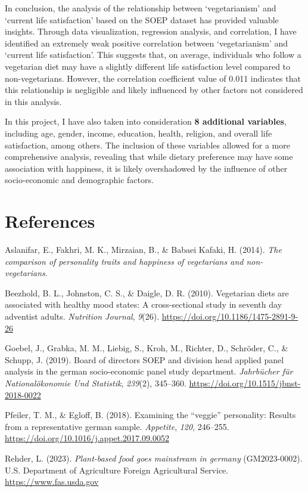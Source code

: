 \documentclass[
]{article}
\newlength{\cslhangindent}
\newenvironment{CSLReferences}[2] %
 {\begin{list}{}{%
  \setlength{\itemindent}{0pt}
  \setlength{\leftmargin}{0pt}
  \setlength{\parsep}{0pt}
  \ifodd #1
   \setlength{\leftmargin}{\cslhangindent}
   \setlength{\itemindent}{-1\cslhangindent}
  \fi
  \setlength{\itemsep}{#2\baselineskip}}}
 {\end{list}}
\begin{document}
In conclusion, the analysis of the relationship between `vegetarianism'
and `current life satisfaction' based on the SOEP dataset has provided
valuable insights. Through data visualization, regression analysis, and
correlation, I have identified an extremely weak positive correlation
between `vegetarianism' and `current life satisfaction'. This suggests
that, on average, individuals who follow a vegetarian diet may have a
slightly different life satisfaction level compared to non-vegetarians.
However, the correlation coefficient value of 0.011 indicates that this
relationship is negligible and likely influenced by other factors not
considered in this analysis.

In this project, I have also taken into consideration \textbf{8
additional variables}, including age, gender, income, education, health,
religion, and overall life satisfaction, among others. The inclusion of
these variables allowed for a more comprehensive analysis, revealing
that while dietary preference may have some association with happiness,
it is likely overshadowed by the influence of other socio-economic and
demographic factors.

\section*{References}\label{references}

\label{refs}
\begin{CSLReferences}{1}{0}
Aslanifar, E., Fakhri, M. K., Mirzaian, B., \& Babaei Kafaki, H. (2014).
\emph{The comparison of personality traits and happiness of vegetarians
and non-vegetarians}.

Beezhold, B. L., Johnston, C. S., \& Daigle, D. R. (2010). Vegetarian
diets are associated with healthy mood states: A cross-sectional study
in seventh day adventist adults. \emph{Nutrition Journal}, \emph{9}(26).
\url{https://doi.org/10.1186/1475-2891-9-26}

Goebel, J., Grabka, M. M., Liebig, S., Kroh, M., Richter, D., Schröder,
C., \& Schupp, J. (2019). Board of directors SOEP and division head
applied panel analysis in the german socio-economic panel study
department. \emph{Jahrb{ü}cher f{ü}r National{ö}konomie Und Statistik},
\emph{239}(2), 345--360. \url{https://doi.org/10.1515/jbnst-2018-0022}

Pfeiler, T. M., \& Egloff, B. (2018). Examining the {``veggie''}
personality: Results from a representative german sample.
\emph{Appetite}, \emph{120}, 246--255.
\url{https://doi.org/10.1016/j.appet.2017.09.0052}

Rehder, L. (2023). \emph{Plant-based food goes mainstream in germany}
(GM2023-0002). U.S. Department of Agriculture Foreign Agricultural
Service. \url{https://www.fas.usda.gov}

\end{CSLReferences}
\end{document}
